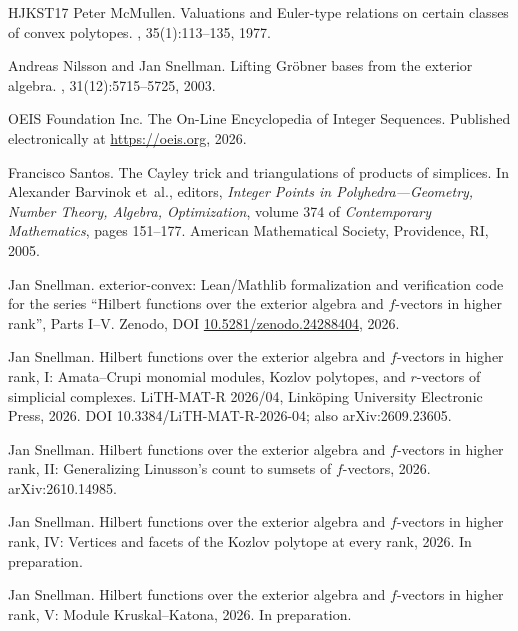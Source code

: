 \documentclass[11pt, a4paper, abstract=yes]{scrartcl}
\theoremstyle{definition}
\theoremstyle{remark}
\theoremstyle{plain}
\theoremstyle{remark}
\theoremstyle{plain}
\begin{document}
\begin{thebibliography}{HJKST17}
Peter McMullen.
\newblock Valuations and {E}uler-type relations on certain classes of convex
  polytopes.
,
  35(1):113--135, 1977.

Andreas Nilsson and Jan Snellman.
\newblock Lifting {G}r{\"o}bner bases from the exterior algebra.
, 31(12):5715--5725, 2003.

{OEIS Foundation Inc.}
\newblock The {On-Line} {E}ncyclopedia of {I}nteger {S}equences.
\newblock Published electronically at \url{https://oeis.org}, 2026.

Francisco Santos.
\newblock The {C}ayley trick and triangulations of products of simplices.
\newblock In Alexander Barvinok et~al., editors, {\em Integer Points in
  Polyhedra---Geometry, Number Theory, Algebra, Optimization}, volume 374 of
  {\em Contemporary Mathematics}, pages 151--177. American Mathematical
  Society, Providence, RI, 2005.

Jan Snellman.
\newblock exterior-convex: {Lean}/{Mathlib} formalization and verification code
  for the series ``{H}ilbert functions over the exterior algebra and
  \(f\)-vectors in higher rank'', {P}arts {I}--{V}.
\newblock Zenodo, DOI
  \href{https://doi.org/10.5281/zenodo.24288404}{10.5281/zenodo.24288404},
  2026.

Jan Snellman.
\newblock Hilbert functions over the exterior algebra and \(f\)-vectors in
  higher rank, {I}: {A}mata--{C}rupi monomial modules, {K}ozlov polytopes, and
  \(r\)-vectors of simplicial complexes.
\newblock LiTH-MAT-R 2026/04, Link{\"o}ping University Electronic Press, 2026.
\newblock DOI 10.3384/LiTH-MAT-R-2026-04; also arXiv:2609.23605.

Jan Snellman.
\newblock Hilbert functions over the exterior algebra and \(f\)-vectors in
  higher rank, {II}: Generalizing {L}inusson's count to sumsets of
  \(f\)-vectors, 2026.
\newblock arXiv:2610.14985.

Jan Snellman.
\newblock Hilbert functions over the exterior algebra and \(f\)-vectors in
  higher rank, {IV}: Vertices and facets of the {K}ozlov polytope at every
  rank, 2026.
\newblock In preparation.

Jan Snellman.
\newblock Hilbert functions over the exterior algebra and \(f\)-vectors in
  higher rank, {V}: Module {K}ruskal--{K}atona, 2026.
\newblock In preparation.


\end{thebibliography}
\end{document}
